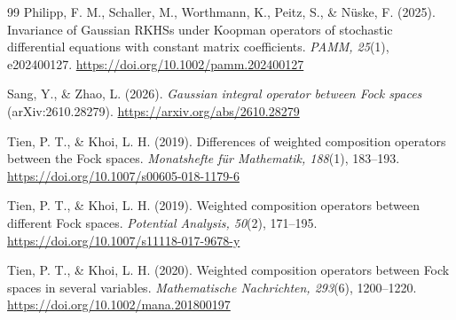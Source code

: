 \documentclass[11pt,a4paper]{article}
\theoremstyle{remark}
\begin{document}
\begin{thebibliography}{99}
Philipp, F. M., Schaller, M., Worthmann, K., Peitz, S., \&
N\"uske, F. (2025).
Invariance of Gaussian RKHSs under Koopman operators of stochastic
differential equations with constant matrix coefficients.
\emph{PAMM, 25}(1), e202400127.
\url{https://doi.org/10.1002/pamm.202400127}

Sang, Y., \& Zhao, L. (2026).
\emph{Gaussian integral operator between Fock spaces}
(arXiv:2610.28279).
\url{https://arxiv.org/abs/2610.28279}

Tien, P. T., \& Khoi, L. H. (2019).
Differences of weighted composition operators between the Fock spaces.
\emph{Monatshefte f\"ur Mathematik, 188}(1), 183--193.
\url{https://doi.org/10.1007/s00605-018-1179-6}

Tien, P. T., \& Khoi, L. H. (2019).
Weighted composition operators between different Fock spaces.
\emph{Potential Analysis, 50}(2), 171--195.
\url{https://doi.org/10.1007/s11118-017-9678-y}

Tien, P. T., \& Khoi, L. H. (2020).
Weighted composition operators between Fock spaces in several variables.
\emph{Mathematische Nachrichten, 293}(6), 1200--1220.
\url{https://doi.org/10.1002/mana.201800197}
\end{thebibliography}
\end{document}
